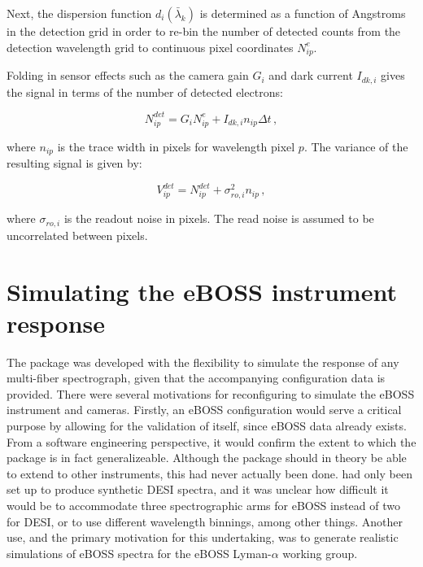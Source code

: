 
Next, the dispersion function $d_i(\bar{\lambda}_{k})$ is determined as a function of Angstroms in the detection grid in order to re-bin the number of detected counts from the detection wavelength grid to continuous pixel coordinates $N_{ip}^{e}$.

Folding in sensor effects such as the camera gain $G_{i}$ and dark current $I_{dk,i}$ gives the signal in terms of the number of detected electrons:

\begin{equation}
    N_{ip}^{det} = G_{i}N_{ip}^{e} + I_{dk,i}n_{ip}\Delta t\,,
\end{equation}

where $n_{ip}$ is the trace width in pixels for wavelength pixel $p$. The variance of the resulting signal is given by:

\begin{equation}
    V_{ip}^{det} = N_{ip}^{det} + \sigma_{ro,i}^{2}n_{ip}\,,
\end{equation}

where $\sigma_{ro,i}$ is the readout noise in pixels. The read noise is assumed to be uncorrelated between pixels.


\section{Simulating the eBOSS instrument response}


The  package was developed with the flexibility to simulate the response of any multi-fiber spectrograph, given that the accompanying configuration data is provided. There were several motivations for reconfiguring  to simulate the eBOSS instrument and cameras. Firstly, an eBOSS configuration would serve a critical purpose by allowing for the validation of  itself, since eBOSS data already exists. From a software engineering perspective, it would confirm the extent to which the package is in fact generalizeable. Although the package should in theory be able to extend to other instruments, this had never actually been done.  had only been set up to produce synthetic DESI spectra, and it was unclear how difficult it would be to accommodate three spectrographic arms for eBOSS instead of two for DESI, or to use different wavelength binnings, among other things. Another use, and the primary motivation for this undertaking, was to generate realistic simulations of eBOSS spectra for the eBOSS Lyman-$\alpha$ working group.

